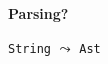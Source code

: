 \begin{frame}[fragile]

\vspace{\fill}

\begin{center}

{\Large \textbf{Parsing?}}

\pause

\medskip

\lstinline|String| $\leadsto$ \lstinline|Ast|

\end{center}

\vspace{\fill}

\end{frame}

